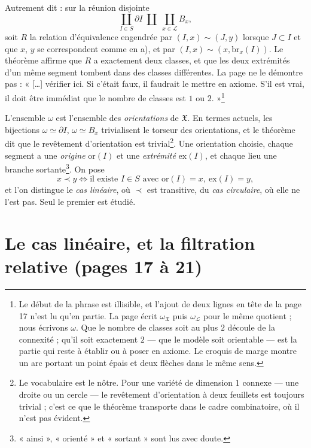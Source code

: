 \documentclass[11pt,a4paper]{article}
\begin{document}
Autrement dit : sur la réunion disjointe
\[
\coprod_{I \in S} \partial I \;\amalg\; \coprod_{x \in \mathcal{L}} B_{x},
\]
soit $R$ la relation d'équivalence engendrée par $(I,x) \sim (J,y)$ lorsque
$J \subset I$ et que $x$, $y$ se correspondent comme en a), et par $(I,x) \sim
(x, \mathrm{br}_{x}(I))$. Le théorème affirme que $R$ a exactement deux
classes, et que les deux extrémités d'un même segment tombent dans des classes
différentes. La page ne le démontre pas : « [\dots] vérifier ici. Si c'était
faux, il faudrait le mettre en axiome. S'il est vrai, il doit être immédiat
que le nombre de classes est $1$ ou $2$. »\footnote{Le début de la phrase est
illisible, et l'ajout de deux lignes en tête de la page 17 n'est lu qu'en
partie. La page écrit $\omega_{\mathfrak{X}}$ puis $\omega_{\mathcal{L}}$ pour
le même quotient ; nous écrivons $\omega$. Que le nombre de classes soit au
plus $2$ découle de la connexité ; qu'il soit exactement $2$ --- que le modèle
soit orientable --- est la partie qui reste à établir ou à poser en axiome. Le
croquis de marge montre un arc portant un point épais et deux flèches dans le
même sens.}

L'ensemble $\omega$ est l'ensemble des \emph{orientations} de $\mathfrak{X}$.
En termes actuels, les bijections $\omega \simeq \partial I$, $\omega \simeq
B_{x}$ trivialisent le torseur des orientations, et le théorème dit que le
revêtement d'orientation est trivial\footnote{Le vocabulaire est le nôtre.
Pour une variété de dimension $1$ connexe --- une droite ou un cercle --- le
revêtement d'orientation à deux feuillets est toujours trivial ; c'est ce que
le théorème transporte dans le cadre combinatoire, où il n'est pas
évident.}. Une orientation choisie, chaque segment a une \emph{origine}
$\mathrm{or}(I)$ et une \emph{extrémité} $\mathrm{ex}(I)$, et chaque lieu une
branche sortante\footnote{« ainsi », « orienté » et « sortant » sont lus avec
doute.}. On pose
\[
x \prec y \iff \text{il existe } I \in S \text{ avec } \mathrm{or}(I) = x,\
\mathrm{ex}(I) = y,
\]
et l'on distingue le \emph{cas linéaire}, où $\prec$ est transitive, du
\emph{cas circulaire}, où elle ne l'est pas. Seul le premier est étudié.

\section*{Le cas linéaire, et la filtration relative (pages 17 à 21)}
\end{document}
